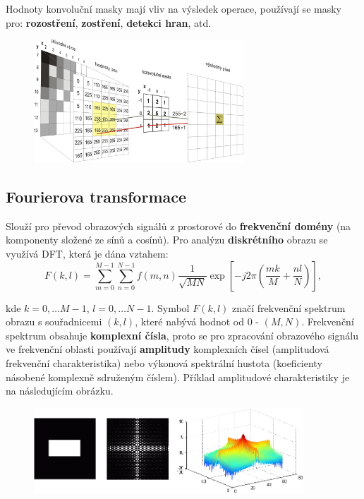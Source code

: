 Hodnoty konvoluční masky mají vliv na výsledek operace, používají se masky pro: \textbf{rozostření}, \textbf{zostření}, \textbf{detekci hran}, atd.

\begin{figure}[H]
	\centering
	\includegraphics[width=0.7\textwidth]{assets/7_konvoluce}
\end{figure}

\subsection{Fourierova transformace}
Slouží pro převod obrazových signálů z prostorové do \textbf{frekvenční domény} (na komponenty složené ze sínů a cosínů). Pro analýzu \textbf{diskrétního} obrazu se využívá DFT, která je dána vztahem:
\begin{equation*}
F(k, l) = \sum_{m = 0}^{M - 1}\sum_{n = 0}^{N - 1} f(m, n) \frac{1}{\sqrt{MN}} \exp \left[ -j2\pi \left( \frac{mk}{M} + \frac{nl}{N} \right) \right],
\end{equation*}

kde $k = 0, \ldots M - 1$, $l = 0, \ldots N - 1$. Symbol $F(k, l)$ značí frekvenční spektrum obrazu s souřadnicemi $(k, l)$, které nabývá hodnot od 0 - $(M, N)$. Frekvenční spektrum obsahuje \textbf{komplexní čísla}, proto se pro zpracování obrazového signálu ve frekvenční oblasti používají \textbf{amplitudy} komplexních čísel (amplitudová frekvenční charakteristika) nebo výkonová spektrální hustota (koeficienty násobené komplexně sdruženým číslem). Příklad amplitudové charakteristiky je na následujícím obrázku.

\begin{figure}[H]
	\centering
	\includegraphics[width=0.9\textwidth]{assets/7_amp_ftt}
\end{figure}

